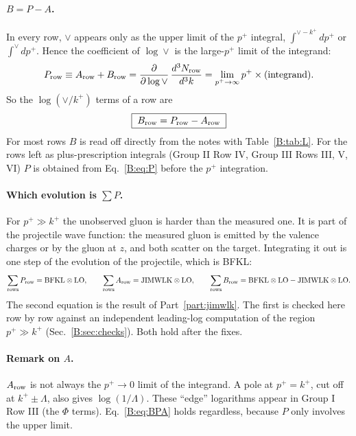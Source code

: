 \documentclass[10pt]{article}
\numberwithin{equation}{section}
\newcommand{\kp}{k^+}
\newcommand{\pp}{p^+}
\begin{document}
\paragraph{$B=P-A$.} In every row, $\vee$ appears only as the upper limit of the $\pp$ integral, $\int^{\vee-k^+}d\pp$ or $\int^{\vee}d\pp$. Hence the coefficient of $\log\vee$ is the large-$\pp$ limit of the integrand:
\begin{equation}
P_{\rm row}\equiv A_{\rm row}+B_{\rm row}=\frac{\partial}{\partial\log\vee}\,\frac{d^3N_{\rm row}}{d^3k}=\lim_{\pp\to\infty}\pp\times(\text{integrand}).
\label{B:eq:P}
\end{equation}
So the $\log(\vee/k^+)$ terms of a row are
\begin{equation}
\boxed{\;B_{\rm row}=P_{\rm row}-A_{\rm row}\;}
\label{B:eq:BPA}
\end{equation}
For most rows $B$ is read off directly from the notes with Table~\ref{B:tab:L}. For the rows left as plus-prescription integrals (Group II Row IV, Group III Rows III, V, VI) $P$ is obtained from Eq.~\eqref{B:eq:P} before the $\pp$ integration.

\paragraph{Which evolution is $\sum P$.} For $\pp\gg\kp$ the unobserved gluon is harder than the measured one. It is part of the projectile wave function: the measured gluon is emitted by the valence charges or by the gluon at $z$, and both scatter on the target. Integrating it out is one step of the evolution of the projectile, which is BFKL:
\begin{equation}
\sum_{\rm rows}P_{\rm row}=\text{BFKL}\otimes\text{LO},\qquad\sum_{\rm rows}A_{\rm row}=\text{JIMWLK}\otimes\text{LO},\qquad
\sum_{\rm rows}B_{\rm row}=\text{BFKL}\otimes\text{LO}-\text{JIMWLK}\otimes\text{LO}.
\label{B:eq:sums}
\end{equation}
The second equation is the result of Part~\ref{part:jimwlk}. The first is checked here row by row against an independent leading-log computation of the region $\pp\gg\kp$ (Sec.~\ref{B:sec:checks}). Both hold after the fixes.

\paragraph{Remark on $A$.} $A_{\rm row}$ is not always the $\pp\to0$ limit of the integrand. A pole at $\pp=\kp$, cut off at $\kp\pm\Lambda$, also gives $\log(1/\Lambda)$. These ``edge'' logarithms appear in Group I Row III (the $\Phi$ terms). Eq.~\eqref{B:eq:BPA} holds regardless, because $P$ only involves the upper limit.
\end{document}
